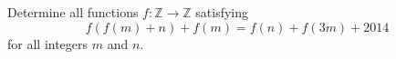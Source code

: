 Determine all functions $f \colon \mathbb{Z} \to \mathbb{Z}$ satisfying
\[ f(f(m) + n) + f(m) = f(n) + f(3m) + 2014 \]
for all integers $m$ and $n$.

